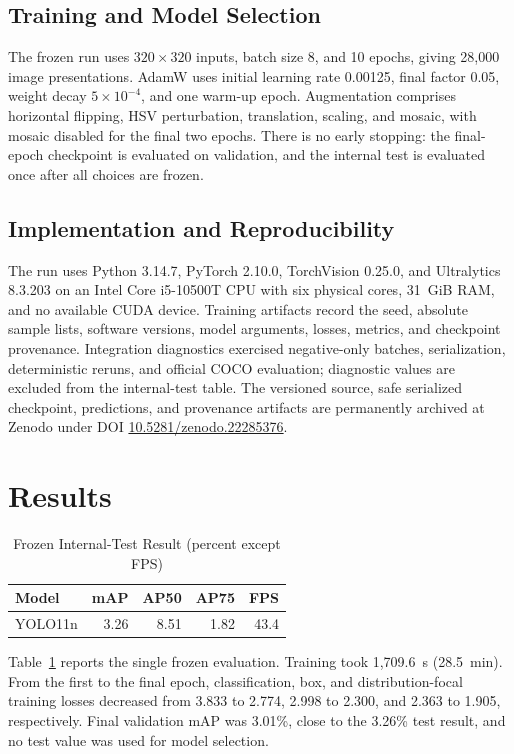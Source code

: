 \documentclass[conference]{ieee-template/vendor/IEEEtran/IEEEtran}
\begin{document}
\subsection{Training and Model Selection}
The frozen run uses $320\times320$ inputs, batch size 8, and 10 epochs, giving
28,000 image presentations. AdamW uses initial learning rate 0.00125, final
factor 0.05, weight decay $5\times10^{-4}$, and one warm-up epoch. Augmentation
comprises horizontal flipping, HSV perturbation, translation, scaling, and
mosaic, with mosaic disabled for the final two epochs. There is no early
stopping: the final-epoch checkpoint is evaluated on validation, and the
internal test is evaluated once after all choices are frozen.

\subsection{Implementation and Reproducibility}
The run uses Python 3.14.7, PyTorch 2.10.0, TorchVision 0.25.0, and Ultralytics
8.3.203 on an Intel Core i5-10500T CPU with six physical cores, 31~GiB RAM, and
no available CUDA device. Training artifacts record the seed, absolute sample
lists, software versions, model arguments, losses, metrics, and checkpoint
provenance. Integration diagnostics exercised negative-only batches,
serialization, deterministic reruns, and official COCO evaluation; diagnostic
values are excluded from the internal-test table.
The versioned source, safe serialized checkpoint, predictions, and provenance
artifacts are permanently archived at Zenodo under DOI
\href{https://doi.org/10.5281/zenodo.22285376}{10.5281/zenodo.22285376}.

\section{Results}
\label{sec:results}

\begin{table}[t]
    \caption{Frozen Internal-Test Result (percent except FPS)}
    \label{tab:main-results}
    \centering
    \begin{tabular}{lrrrr}
        \toprule
        Model & mAP & AP50 & AP75 & FPS \\
        \midrule
        YOLO11n & 3.26 & 8.51 & 1.82 & 43.4 \\
        \bottomrule
    \end{tabular}
\end{table}

Table~\ref{tab:main-results} reports the single frozen evaluation. Training took
1,709.6~s (28.5~min). From the first to the final epoch, classification, box,
and distribution-focal training losses decreased from 3.833 to 2.774, 2.998 to
2.300, and 2.363 to 1.905, respectively. Final validation mAP was 3.01\%, close
to the 3.26\% test result, and no test value was used for model selection.
\end{document}
